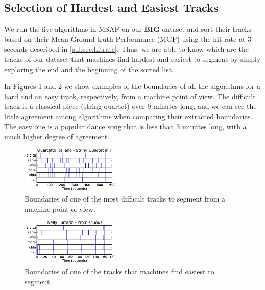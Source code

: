\documentclass{article}
\begin{document}
\subsection{Selection of Hardest and Easiest Tracks}\label{sub:hard-easy}

We run the five algorithms in MSAF on our \textbf{BIG} dataset and sort their tracks based on their Mean Ground-truth Performance (MGP) using the hit rate at 3 seconds described in \ref{subsec:hitrate}.
Thus, we are able to know which are the tracks of our dataset that machines find hardest and easiest to segment by simply exploring the end and the beginning of the sorted list.

In Figures \ref{fig:quartetto} and \ref{fig:promiscuous} we show examples of the boundaries of all the algorithms for a hard and an easy track, respectively, from a machine point of view.
The difficult track is a classical piece (string quartet) over 9 minutes long, and we can see the little agreement among algorithms when comparing their extracted boundaries.
The easy one is a popular dance song that is less than 3 minutes long, with a much higher degree of agreement.

\begin{figure}
  \centering
  \includegraphics[width=0.45\textwidth, height=0.13\textheight]{plots/Quartetto-machine.pdf}
  \caption{Boundaries of one of the most difficult tracks to segment from a machine point of view.}
  \label{fig:quartetto}
\end{figure}%

\begin{figure}
  \centering
  \includegraphics[width=0.45\textwidth, height=0.13\textheight]{plots/Promiscuous-machine.pdf}
  \caption{Boundaries of one of the tracks that machines find easiest to segment.}
  \label{fig:promiscuous}
\end{figure}%
\end{document}
